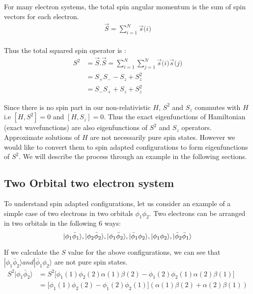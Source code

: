 \documentclass[11pt]{article}   	%
\begin{document}
	For many electron systems, the total spin angular momentum is the sum of spin vectors for each 
	electron.\\
	\begin{equation}
	\begin{split}
		\vec{S}=\sum_{i=1}^N \vec{s}\big(i\big)\\
	\end{split}
	\end{equation}	
	
	Thus the total squared spin operator is :\\
	\begin{equation}
	\begin{split}
		S^2 &=\vec{S} .\vec{S}=\sum_{i=1}^N \sum_{j=1}^N \vec{s}\big(i\big)\vec{s}\big(j\big)\\
			&=S_+S_--S_z+S_z^2\\
			&=S_-S_++S_z+S_z^2
	\end{split}
	\end{equation}
	
	Since there is no spin part in our non-relativistic $H$, $S^2$ and $S_z$ commutes with $H$ 
	i.e $[H,S^2]=0$	and $[H,S_z]=0$. Thus the exact eigenfunctions of Hamiltonian (exact wavefunctions) 
	are also eigenfunctions of $S^2$ and $S_z$ operators.\\ 
	
	Approximate solutions of $H$ are not necessarily pure spin states. However we would like to convert
	them to spin adapted configurations to form eigenfunctions of $S^2$. We will describe the process 
	through an example in the following sections. \\
	

	\subsection{Two Orbital two electron system}
	To understand spin adapted configurations, let us consider an example of a simple case of two electrons in two 
	orbitals $\phi_1 \phi_2$. Two electrons can be arranged in two orbitals in the following 6 ways: \\
	\begin{equation}
		|\phi_1\bar{\phi}_1\rangle, |\phi_2\bar{\phi}_2\rangle, |\phi_1\bar{\phi}_2\rangle, |\bar{\phi}_1\phi_2\rangle, |\phi_1\phi_2\rangle, |\bar{\phi}_2\bar{\phi}_1\rangle\\ 
	\end{equation}
	
	If we calculate the $S$ value for the above configurations, we can see that $|\phi_1\bar{\phi}_2\rangle
	and  |\bar{\phi}_1\phi_2\rangle$ are not pure spin states. \\
	\begin{equation}
	\begin{split}
	S^2|\phi_1\bar{\phi}_2\rangle&=S^2\big[\phi_1(1)\phi_2(2)\alpha(1) \beta(2)-\phi_1(2)\phi_2(1)\alpha(2) \beta(1)\big]\\
		&=\big[\phi_1(1)\phi_2(2)-\phi_1(2)\phi_2(1)\big](\alpha(1) \beta(2)+\alpha(2)\beta(1))
	\end{split}
	\end{equation}
	
\end{document}
